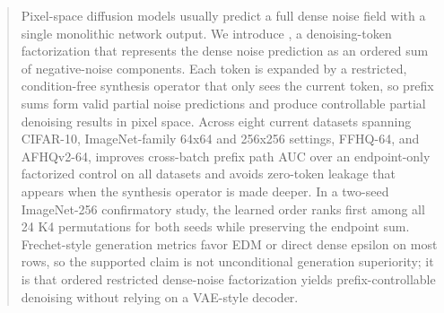 \begin{abstract}
Pixel-space diffusion models usually predict a full dense noise field with a
single monolithic network output. We introduce \method, a denoising-token
factorization that represents the dense noise prediction as an ordered sum of
negative-noise components. Each token is expanded by a restricted,
condition-free synthesis operator that only sees the current token, so prefix
sums form valid partial noise predictions and produce controllable partial
denoising results in pixel space. Across eight current datasets spanning
CIFAR-10, ImageNet-family 64x64 and 256x256 settings, FFHQ-64, and AFHQv2-64,
\method{} improves cross-batch prefix path AUC over an endpoint-only factorized control
on all datasets and avoids zero-token leakage that appears when the synthesis
operator is made deeper. In a two-seed ImageNet-256 confirmatory study, the
learned order ranks first among all 24 K4 permutations for both seeds while
preserving the endpoint sum. Frechet-style generation metrics favor EDM or direct dense
epsilon on most rows, so the supported claim is not unconditional generation
superiority; it is that ordered restricted dense-noise factorization yields
 prefix-controllable denoising without relying on a VAE-style decoder.
\end{abstract}
